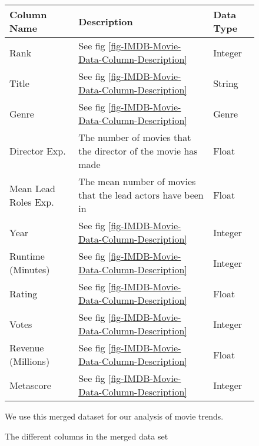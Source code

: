         \begin{figure}[h]
            \begin{tabular}[width = \textwidth]{lll}
                \toprule
                Column Name &           Description                                                                 & Data Type \\
                \midrule
                Rank &                  See fig \ref*{fig-IMDB-Movie-Data-Column-Description}                       & Integer \\          
                Title &                 See fig \ref*{fig-IMDB-Movie-Data-Column-Description}                       & String \\
                Genre &                 See fig \ref*{fig-IMDB-Movie-Data-Column-Description}                       & Genre \\
                Director Exp. &         The number of movies that the director of the movie has made                & Float \\
                Mean Lead Roles Exp. &  The mean number of movies that the lead actors have been in                 & Float \\
                Year  &                 See fig \ref*{fig-IMDB-Movie-Data-Column-Description}                       & Integer \\
                Runtime (Minutes) &     See fig \ref*{fig-IMDB-Movie-Data-Column-Description}                       & Integer \\ 
                Rating   &              See fig \ref*{fig-IMDB-Movie-Data-Column-Description}                       & Float \\
                Votes   &               See fig \ref*{fig-IMDB-Movie-Data-Column-Description}                       & Integer \\ 
                Revenue (Millions) &    See fig \ref*{fig-IMDB-Movie-Data-Column-Description}                       & Float \\  
                Metascore   &           See fig \ref*{fig-IMDB-Movie-Data-Column-Description}                       & Integer \\
                \bottomrule
            \end{tabular}
        \caption[short]{The different columns in the merged data set}\label{fig-merged-data-column-description}
        We use this merged dataset for our analysis of movie trends.
    \end{figure}